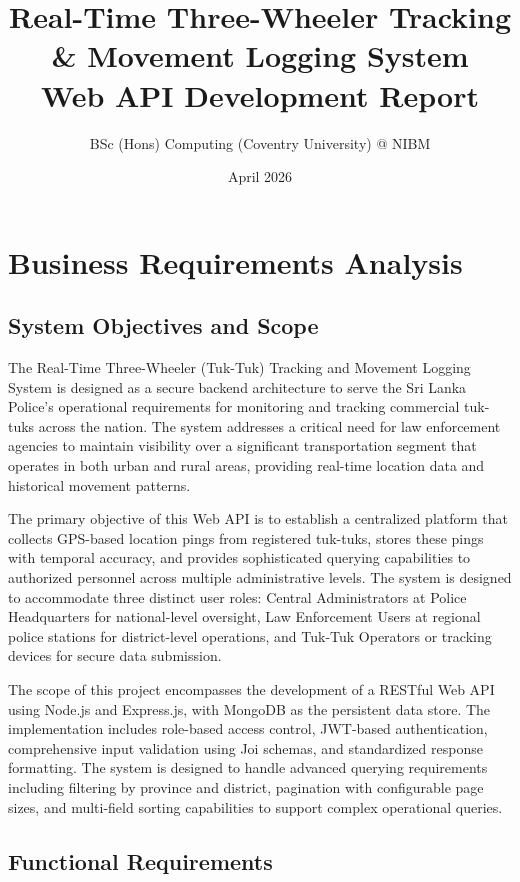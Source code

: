 \documentclass[12pt,a4paper]{article}
\title{\textbf{Real-Time Three-Wheeler Tracking \& Movement Logging System\\
Web API Development Report}}
\author{BSc (Hons) Computing (Coventry University) @ NIBM}
\date{April 2026}
\begin{document}
\maketitle
\newpage

\tableofcontents
\newpage

\section{Business Requirements Analysis}

\subsection{System Objectives and Scope}

The Real-Time Three-Wheeler (Tuk-Tuk) Tracking and Movement Logging System is designed as a secure backend architecture to serve the Sri Lanka Police's operational requirements for monitoring and tracking commercial tuk-tuks across the nation. The system addresses a critical need for law enforcement agencies to maintain visibility over a significant transportation segment that operates in both urban and rural areas, providing real-time location data and historical movement patterns.

The primary objective of this Web API is to establish a centralized platform that collects GPS-based location pings from registered tuk-tuks, stores these pings with temporal accuracy, and provides sophisticated querying capabilities to authorized personnel across multiple administrative levels. The system is designed to accommodate three distinct user roles: Central Administrators at Police Headquarters for national-level oversight, Law Enforcement Users at regional police stations for district-level operations, and Tuk-Tuk Operators or tracking devices for secure data submission.

The scope of this project encompasses the development of a RESTful Web API using Node.js and Express.js, with MongoDB as the persistent data store. The implementation includes role-based access control, JWT-based authentication, comprehensive input validation using Joi schemas, and standardized response formatting. The system is designed to handle advanced querying requirements including filtering by province and district, pagination with configurable page sizes, and multi-field sorting capabilities to support complex operational queries.

\subsection{Functional Requirements}
\end{document}
